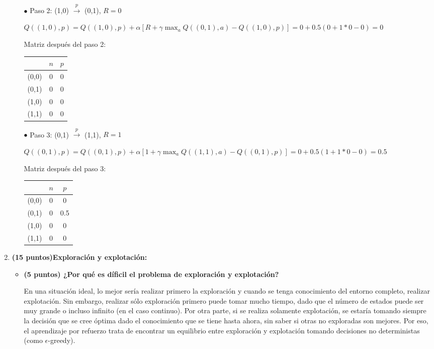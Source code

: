 \documentclass[a4paper,10pt]{article}
\begin{document}
\begin{enumerate}
\begin{itemize}
	$\bullet$ Paso 2: (1,0) $\xrightarrow{p}$ (0,1), $R=0$
	
	$Q((1,0), p) = Q((1,0), p) + \alpha [R + \gamma \max_a Q((0,1), a) - Q((1,0), p)] = 0 + 0.5(0 + 1*0 - 0) = 0$
	
	Matriz después del paso 2:
	
	\begin{tabular}{|c|c|c|}
	\hline
	   & $n$ & $p$ \\ \hline
	(0,0) & 0 & 0 \\ \hline
	(0,1) & 0 & 0 \\ \hline
	(1,0) & 0 & 0 \\ \hline
	(1,1) & 0 & 0 \\ \hline
	\end{tabular}
	
	$\bullet$ Paso 3: (0,1) $\xrightarrow{p}$ (1,1), $R=1$
	
	$Q((0,1), p) = Q((0,1), p) + \alpha [1 + \gamma \max_a Q((1,1), a) - Q((0,1), p)] = 0 + 0.5(1 + 1*0 - 0) = 0.5$
	
	Matriz después del paso 3:
	
	\begin{tabular}{|c|c|c|}
	\hline
	   & $n$ & $p$ \\ \hline
	(0,0) & 0 & 0 \\ \hline
	(0,1) & 0 & 0.5 \\ \hline
	(1,0) & 0 & 0 \\ \hline
	(1,1) & 0 & 0 \\ \hline
	\end{tabular}
	
    \end{itemize}

    \item \textbf{(15 puntos)Exploración y explotación:}
    \begin{itemize}
	\item \textbf{(5 puntos) ¿Por qué es díficil el problema de exploración y explotación?}
	
	En una situación ideal, lo mejor sería realizar primero la exploración y cuando se tenga conocimiento del entorno completo, realizar explotación. Sin embargo, realizar sólo exploración primero puede tomar mucho tiempo, dado que el número de estados puede ser muy grande o incluso infinito (en el caso continuo). Por otra parte, si se realiza solamente explotación, se estaría tomando siempre la decisión que se cree óptima dado el conocimiento que se tiene hasta ahora, sin saber si otras no exploradas son mejores. Por eso, el aprendizaje por refuerzo trata de encontrar un equilibrio entre exploración y explotación tomando decisiones no deterministas (como $\epsilon$-greedy).
	

\end{itemize}
\end{enumerate}
\end{document}
